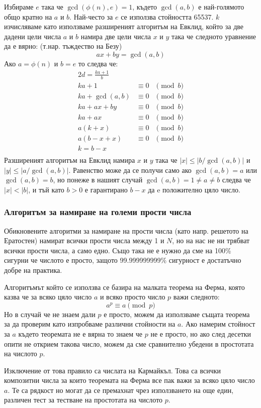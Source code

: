 Избираме $e$ така че $\gcd(\phi(n), e) = 1$, където $\gcd(a,b)$ е най-голямото общо кратно на $a$ и $b$. Най-често за $e$ се използва стойността 65537. $k$ изчисляваме като използваме разширеният алгоритъм на Евклид, който за две дадени цели числа $a$ и $b$ намира две цели числа $x$ и $y$ така че следното уравнение да е вярно: (т.нар. тъждество на Безу)
$$ ax + by = \gcd(a,b) $$
Ако $a = \phi(n)$ и $b = e$ то следва че:
\begin{alignat*}{2}
d = \frac{ka+1}{b} \\
ka + 1 &\equiv 0 &\pmod b \\
ka + \gcd(a,b) &\equiv 0 &\pmod b \\
ka + ax + by &\equiv 0 &\pmod b \\
ka + ax &\equiv 0 &\pmod b \\
a(k+x) &\equiv 0 &\pmod b \\
a(b-x+x) &\equiv 0 &\pmod b \\
k = b-x \\
\end{alignat*}
Разширеният алгоритъм на Евклид намира $x$ и $y$ така че $|x|\leq|b/\gcd(a,b)|$ и $|y|\leq|a/\gcd(a,b)|$. Равенство може да се получи само ако $\gcd(a,b)=a$ или $\gcd(a,b)=b$, но понеже в нашият случай $\gcd(a,b)=1\neq a\neq b$ следва че $|x|<|b|$, и тъй като $b>0$ е гарантирано $b-x$ да e положително цяло число.

\subsubsection{Алгоритъм за намиране на големи прости числа} \label{fermatprimes}
Обикновените алгоритми за намиране на прости числа (като напр. решетото на Ератостен) намират всички прости числа между 1 и $N$, но на нас не ни трябват всички прости числа, а само едно. Също така не е нужно да сме на 100\% сигурни че числото е просто, защото 99.999999999\% сигурност е достатъчно добре на практика.

Алгоритъмът който се използва се базира на малката теорема на Ферма, която казва че за всяко цяло число $a$ и всяко просто число $p$ важи следното:
$$ a^p \equiv a \pmod p $$
Но в случай че не знаем дали $p$ е просто, можем да използваме същата теорема за да проверим като изпробваме различни стойности на $a$. Ако намерим стойност за $a$ където теоремата не е вярна то знаем че $p$ не е просто, но ако след десетки опити не открием такова число, можем да сме сравнително убедени в простотата на числото $p$.

Изключение от това правило са числата на Кармайкъл. Това са всички композитни числа за които теоремата на Ферма все пак важи за всяко цяло число $a$. Те са рядкост но могат да се премахнат чрез използването на още един, различен тест за тестване на простотата на числото $p$.

